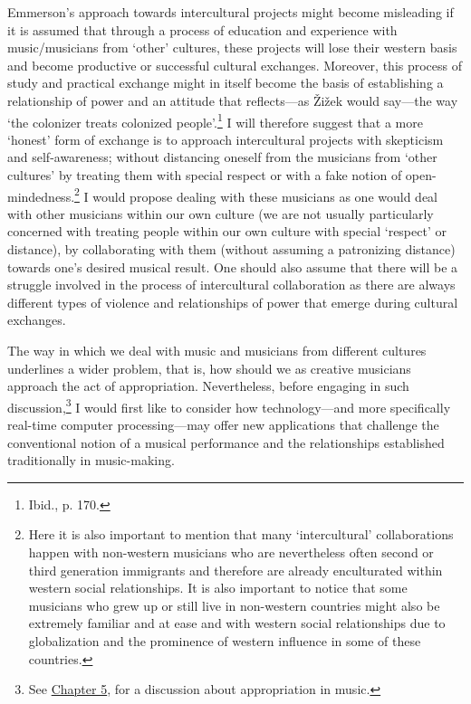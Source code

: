 Emmerson's approach towards intercultural projects might become misleading if it is assumed that through a process of education and experience with music/musicians from `other' cultures, these projects will lose their western basis and become productive or successful cultural exchanges. Moreover, this process of study and practical exchange might in itself become the basis of establishing a relationship of power and an attitude that reflects---as \v{Z}i\v{z}ek would say---the way `the colonizer treats colonized people'.\footnote{Ibid., p. 170.} I will therefore suggest that a more `honest' form of exchange is to approach intercultural projects with skepticism and self-awareness; without distancing oneself from the musicians from `other cultures' by treating them with special respect or with a fake notion of open-mindedness.\footnote{Here it is also important to mention that many `intercultural' collaborations happen with non-western musicians who are nevertheless often second or third generation immigrants and therefore are already enculturated within western social relationships. It is also important to notice that some musicians who grew up or still live in non-western countries might also be extremely familiar and at ease and with western social relationships due to globalization and the prominence of western influence in some of these countries.} I would propose dealing with these musicians as one would deal with other musicians within our own culture (we are not usually particularly concerned with treating people within our own culture with special `respect' or distance), by collaborating with them (without assuming a patronizing distance) towards one's desired musical result. One should also assume that there will be a struggle involved in the process of intercultural collaboration as there are always different types of violence and relationships of power that emerge during cultural exchanges. 

The way in which we deal with music and musicians from different cultures underlines a wider problem, that is, how should we as creative musicians approach the act of appropriation. Nevertheless, before engaging in such discussion,\footnote{See \hyperlink{chapter5}{Chapter 5}, for a discussion about appropriation in music.} I would first like to consider how technology---and more specifically real-time computer processing---may offer new applications that challenge the conventional notion of a musical performance and the relationships established traditionally in music-making.

